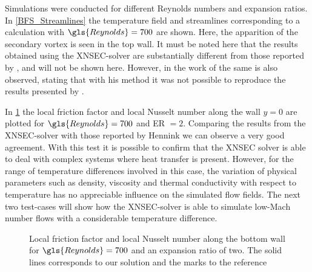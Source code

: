 Simulations were conducted for different Reynolds numbers and expansion ratios. In \cref{BFS_Streamlines} the temperature field and streamlines corresponding to a calculation with $\gls{Reynolds} = 700$ are shown. Here, the apparition of the secondary vortex is seen in the top wall. It must be noted here that the results obtained using the XNSEC-solver are substantially different from those reported by \cite{xieFluidFlowHeat2016}, and will not be shown here. However, in the work of \cite{henninkLowMachNumberFlow2022} the same is also observed, stating that with his method it was not possible to reproduce the results presented by \cite{xieFluidFlowHeat2016}. 

In \cref{fig:fd_Nu_plot} the local friction factor and local Nusselt number along the wall $y = 0$ are plotted for $\gls{Reynolds} = 700$ and ER $= 2$. Comparing the results from the XNSEC-solver with those reported by Hennink we can observe a very good agreement.
With this test it is possible to confirm that the XNSEC solver is able to deal with complex systems where heat transfer is present. However, for the range of temperature differences involved in this case, the variation of physical parameters such as density, viscosity and thermal conductivity with respect to temperature has no appreciable influence on the simulated flow fields. The next two test-cases will show how the XNSEC-solver is able to simulate low-Mach number flows with a considerable temperature difference.
\begin{figure}[tb]
	\caption{Local friction factor and local Nusselt number along the bottom wall for $\gls{Reynolds} = 700$ and an expansion ratio of two. The solid lines corresponds to our solution and the marks to the reference \citep{henninkLowMachNumberFlow2022}}
	\label{fig:fd_Nu_plot}
\end{figure}
\FloatBarrier